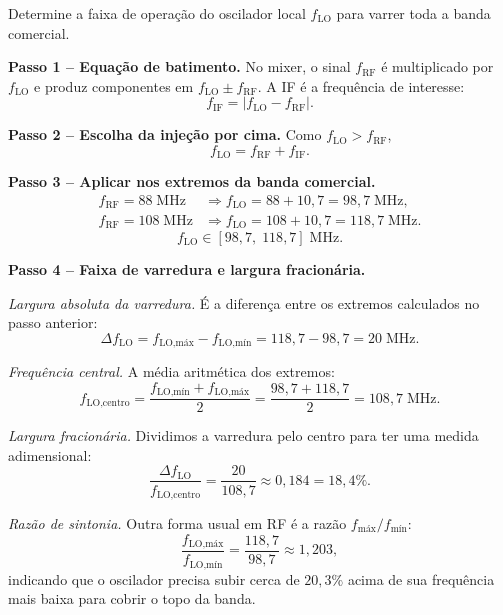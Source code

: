 \documentclass[11pt,a4paper]{article}
\begin{document}
\begin{enunciado}[Item a)]
Determine a faixa de operação do oscilador local $f_{\text{LO}}$ para varrer toda a banda comercial.
\end{enunciado}

\begin{resolucao}

\textbf{Passo 1 -- Equação de batimento.} No mixer, o sinal $f_{\text{RF}}$ é multiplicado por $f_{\text{LO}}$ e produz componentes em $f_{\text{LO}} \pm f_{\text{RF}}$. A IF é a frequência de interesse:
\[
  f_{\text{IF}} = |f_{\text{LO}} - f_{\text{RF}}|.
\]

\textbf{Passo 2 -- Escolha da injeção por cima.} Como $f_{\text{LO}} > f_{\text{RF}}$,
\[
  f_{\text{LO}} = f_{\text{RF}} + f_{\text{IF}}.
\]

\textbf{Passo 3 -- Aplicar nos extremos da banda comercial.}
\begin{align*}
  f_{\text{RF}} = 88\;\text{MHz} &\Rightarrow f_{\text{LO}} = 88 + 10{,}7 = 98{,}7\;\text{MHz}, \\
  f_{\text{RF}} = 108\;\text{MHz} &\Rightarrow f_{\text{LO}} = 108 + 10{,}7 = 118{,}7\;\text{MHz}.
\end{align*}
\[
  \boxed{f_{\text{LO}} \in [98{,}7,\; 118{,}7]\;\text{MHz}.}
\]

\textbf{Passo 4 -- Faixa de varredura e largura fracionária.}

\emph{Largura absoluta da varredura.} É a diferença entre os extremos calculados no passo anterior:
\[
  \Delta f_{\text{LO}} = f_{\text{LO,máx}} - f_{\text{LO,mín}} = 118{,}7 - 98{,}7 = 20\;\text{MHz}.
\]

\emph{Frequência central.} A média aritmética dos extremos:
\[
  f_{\text{LO,centro}} = \frac{f_{\text{LO,mín}} + f_{\text{LO,máx}}}{2}
                       = \frac{98{,}7 + 118{,}7}{2}
                       = 108{,}7\;\text{MHz}.
\]

\emph{Largura fracionária.} Dividimos a varredura pelo centro para ter uma medida adimensional:
\[
  \frac{\Delta f_{\text{LO}}}{f_{\text{LO,centro}}}
   = \frac{20}{108{,}7}
   \approx 0{,}184
   = 18{,}4\%.
\]

\emph{Razão de sintonia.} Outra forma usual em RF é a razão $f_{\text{máx}}/f_{\text{mín}}$:
\[
  \frac{f_{\text{LO,máx}}}{f_{\text{LO,mín}}} = \frac{118{,}7}{98{,}7} \approx 1{,}203,
\]
indicando que o oscilador precisa subir cerca de $20{,}3\%$ acima de sua frequência mais baixa para cobrir o topo da banda.


\end{resolucao}
\end{document}
